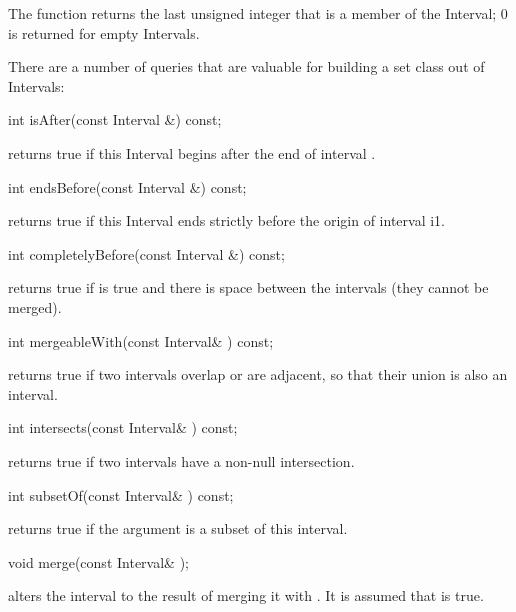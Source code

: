 The  function returns the last unsigned integer that is a
member of the Interval; 0 is returned for empty Intervals.

There are a number of queries that are valuable for building a set
class out of Intervals:

\begin{example}
int isAfter(const Interval &) const;
\end{example}

 returns true if this Interval begins after the end of
interval 
.
\begin{example}
int endsBefore(const Interval &) const;
\end{example}

 returns true if this Interval ends strictly before
the origin of interval i1.

\begin{example}
int completelyBefore(const Interval &) const;
\end{example}

 returns true if  is true and there
is space between the intervals (they cannot be merged).

\begin{example}
int mergeableWith(const Interval& ) const;
\end{example}

 returns true if two intervals overlap or are
adjacent, so that their union is also an interval.

\begin{example}
int intersects(const Interval& ) const;
\end{example}

 returns true if two intervals have a non-null
intersection.

\begin{example}
int subsetOf(const Interval& ) const;
\end{example}

 returns true if the argument is a subset of this interval.

\begin{example}
void merge(const Interval& );
\end{example}

 alters the interval to the result of merging it with .
It is assumed that  is true.

